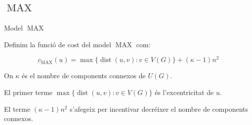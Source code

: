 \documentclass[aspectratio=169,handout]{beamer}
\DeclareMathOperator{\dist}{dist}
\DeclareMathOperator{\MAX}{MAX}
\begin{document}
\subsection{\texorpdfstring{$\MAX$}{MAX}}
\begin{frame}{Model $\MAX$}

Definim la funció de cost del model $\MAX$ com:

\begin{equation}
    c_{\MAX}(u) = \max \{ \dist(u, v) : v \in V(G) \} + (\kappa - 1)n^2
\end{equation}

On $\kappa$ és el nombre de components connexos de $U(G)$.

\vspace{2em}

El primer terme $\max \{ \dist(u, v) : v \in V(G) \}$ és l'excentricitat de $u$.

El terme $(\kappa - 1)n^2$ s'afegeix per incentivar decréixer el nombre de components connexos.

\end{frame}
\end{document}

